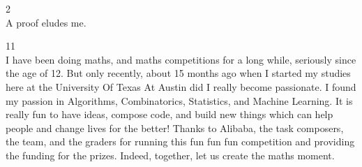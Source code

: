 2 \\
A proof eludes me.

11 \\
I have been doing maths, and maths competitions for a long while, seriously since the age of 12. But only recently, about 15 months ago when I started my studies here at the University Of Texas At Austin did I really become passionate. I found my passion in Algorithms, Combinatorics, Statistics, and Machine Learning. It is really fun to have ideas, compose code, and build new things which can help people and change lives for the better! Thanks to Alibaba, the task composers, the team, and the graders for running this fun fun fun competition and providing the funding for the prizes. Indeed, together, let us create the maths moment.